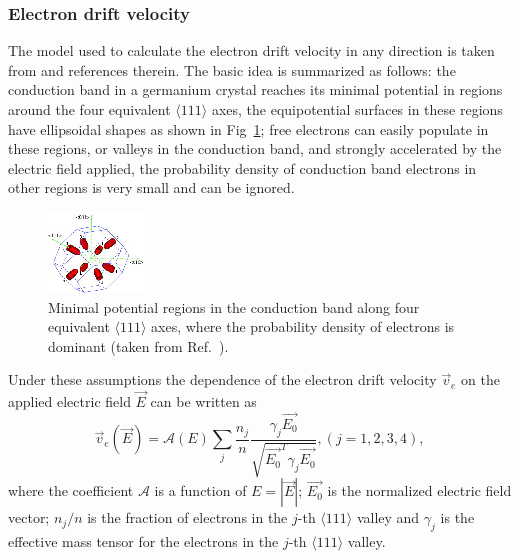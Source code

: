 \documentclass[epj]{svjour}
\begin{document}
\subsubsection{Electron drift velocity} 
\label{s:elec} 
The model used to calculate the electron drift velocity in any
direction is taken from \cite{miha} and references therein. The basic
idea is summarized as follows: the conduction band in a germanium
crystal reaches its minimal potential in regions around the four
equivalent $\langle 111 \rangle$ axes, the equipotential surfaces in
these regions have ellipsoidal shapes as shown in Fig~\ref{f:valley};
free electrons can easily populate in these regions, or valleys in the
conduction band, and strongly accelerated by the electric field
applied, the probability density of conduction band electrons in other
regions is very small and can be ignored.
\begin{figure}[htpb]
\centering
\includegraphics[width=0.6\linewidth]{valleys}   
\caption{Minimal potential regions in the conduction band along four
equivalent $\langle 111 \rangle$ axes, where the probability density
of electrons is dominant (taken from Ref.~\cite{bart}).}
\label{f:valley} 
\end{figure} 

Under these assumptions the dependence of the electron drift velocity
$\vec{v}_{e}$ on the applied electric field $\vec{E}$ can be written
as
\begin{equation} 
\label{e:ed} 
\vec{v}_{e}(\vec{E}) = \mathcal{A}(E) \sum_{j} \frac{n_{j}}{n} 
\frac{\gamma_{j}\vec{E_{0}}}
{\sqrt{\vec{E_{0}}^{T}\gamma_{j}\vec{E_{0}}}}, 
(j=1,2,3,4),
\end{equation} 
where the coefficient $\mathcal{A}$ is a function of $E = |\vec{E}|$;
$\vec{E_{0}}$ is the normalized electric field vector; $n_{j}/n$ is
the fraction of electrons in the $j$-th $\langle 111 \rangle$ valley
and $\gamma_{j}$ is the effective mass tensor for the electrons in the
$j$-th $\langle 111 \rangle$ valley. 
\end{document}

